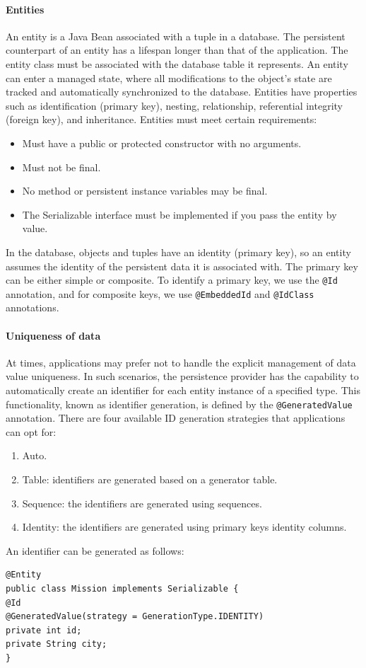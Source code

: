\paragraph*{Entities}
An entity is a Java Bean associated with a tuple in a database. 
The persistent counterpart of an entity has a lifespan longer than that of the application.
The entity class must be associated with the database table it represents. 
An entity can enter a managed state, where all modifications to the object's state are tracked and automatically synchronized to the database.
Entities have properties such as identification (primary key), nesting, relationship, referential integrity (foreign key), and inheritance. 
Entities must meet certain requirements:
\begin{itemize}
    \item Must have a public or protected constructor with no arguments.
    \item Must not be final.
    \item No method or persistent instance variables may be final.
    \item The Serializable interface must be implemented if you pass the entity by value.
\end{itemize}
In the database, objects and tuples have an identity (primary key), so an entity assumes the identity of the persistent data it is associated with.
The primary key can be either simple or composite. 
To identify a primary key, we use the \texttt{@Id} annotation, and for composite keys, we use \texttt{@EmbeddedId} and \texttt{@IdClass} annotations.

\paragraph*{Uniqueness of data}
At times, applications may prefer not to handle the explicit management of data value uniqueness. 
In such scenarios, the persistence provider has the capability to automatically create an identifier for each entity instance of a specified type. 
This functionality, known as identifier generation, is defined by the \texttt{@GeneratedValue} annotation. 
There are four available ID generation strategies that applications can opt for:
\begin{enumerate}
    \item Auto. 
    \item Table: identifiers are generated based on a generator table.
    \item Sequence: the identifiers are generated using sequences. 
    \item Identity: the identifiers are generated using primary keys identity columns. 
\end{enumerate}
\begin{example}
    An identifier can be generated as follows: 
    \begin{lstlisting}[style=Java]
@Entity
public class Mission implements Serializable {
@Id
@GeneratedValue(strategy = GenerationType.IDENTITY)
private int id;
private String city;
}
    \end{lstlisting}
\end{example}

